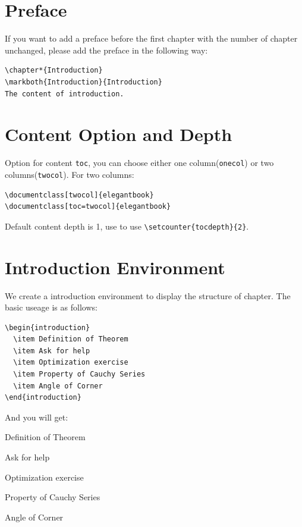 \documentclass[11pt]{elegantbook}
\begin{document}
\section{Preface}

If you want to add a preface before the first chapter with the number of chapter unchanged, please add the preface in the following way:
\begin{lstlisting}
\chapter*{Introduction}
\markboth{Introduction}{Introduction}
The content of introduction.
\end{lstlisting}

\section{Content Option and Depth}
Option for content \lstinline{toc}, you can  choose either one column(\lstinline{onecol}) or two columns(\lstinline{twocol}). For two columns:
\begin{lstlisting}
\documentclass[twocol]{elegantbook}
\documentclass[toc=twocol]{elegantbook}
\end{lstlisting}

Default content depth is 1, use to use \lstinline|\setcounter{tocdepth}{2}|.

\section{Introduction Environment}
We create a introduction environment to display the structure of chapter. The basic useage is as follows:
\begin{lstlisting}
\begin{introduction}
  \item Definition of Theorem
  \item Ask for help
  \item Optimization exercise
  \item Property of Cauchy Series
  \item Angle of Corner
\end{introduction}
\end{lstlisting}
And you will get:
\begin{introduction}
  \item Definition of Theorem
  \item Ask for help
  \item Optimization exercise
  \item Property of Cauchy Series
  \item Angle of Corner
\end{introduction}
\end{document}
